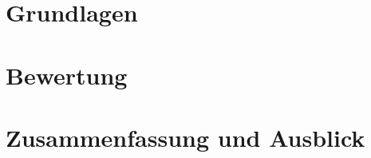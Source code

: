 \documentclass[11pt]{article}
\numberwithin{equation}{section}
\begin{document}
\section{Grundlagen}
\label{sec:abschn1}




\section{Bewertung}
\label{sec:abschn3}


\section{Zusammenfassung und Ausblick}
\label{sec:conclusion}


\newpage


\end{document}
